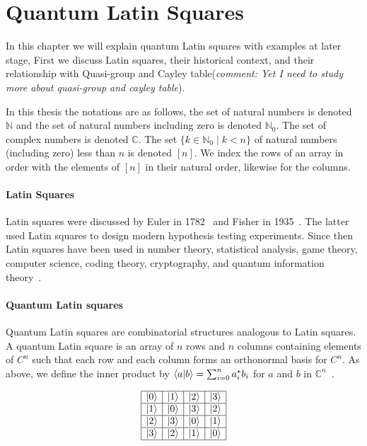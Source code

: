 \chapter{Quantum Latin Squares}

In this chapter we will explain quantum Latin squares with examples at later stage, First we discuss Latin squares, their historical context, and their relationship with Quasi-group and Cayley table(\textit{comment: Yet I need to study more about quasi-group and cayley table}). 

In this thesis the notations are as follows, the set of natural numbers is denoted $\mathbb{N}$ and the set of natural numbers including zero is denoted $\mathbb{N}_0$.
The set of complex numbers is denoted $\mathbb{C}$.
The set $\{ k \in \mathbb{N}_0 \mid k < n \}$ of natural numbers (including zero) less than $n$ is denoted $[n]$.
We index the rows of an array in order with the elements of $[n]$ in their natural order, likewise for the columns.


\subsubsection{Latin Squares}

Latin squares were discussed by Euler in 1782~\cite{macneish1922EulerSquares} and Fisher in 1935~\cite{fisher1960DesignExperiments}.
The latter used Latin squares to design modern hypothesis testing experiments.
Since then Latin squares have been used in number theory, statistical analysis, game theory, computer science, coding theory, cryptography, and quantum information theory~\cite{keedwell2015LatinSquaresTheir}.

\subsubsection{Quantum Latin squares}

Quantum Latin squares are combinatorial structures analogous to Latin squares.
A quantum Latin square is an array of $n$ rows and $n$ columns containing elements of $C^n$ such that each row and each column forms an orthonormal basis for $C^n$.
As above, we define the inner product by $\braket{a | b} = \sum_{i=0}^{n} a_i^* b_i$ for $a$ and $b$ in $\mathbb{C}^n$~\cite{zauner2011QuantumDesignsFoundations}.


$$
\begin{array}{|c|c|c|c|}
  \hline
  \ket{0} & \ket{1} & \ket{2} & \ket{3} \\
  \hline
  \ket{1} & \ket{0} & \ket{3} & \ket{2} \\
  \hline
  \ket{2} & \ket{3} & \ket{0} & \ket{1} \\
  \hline
  \ket{3} & \ket{2} & \ket{1} & \ket{0} \\
  \hline
\end{array}
$$



